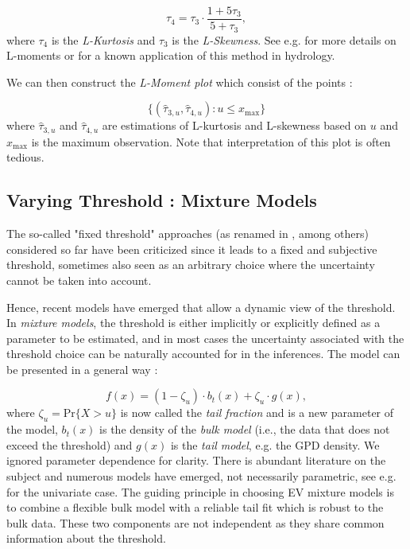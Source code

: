 \begin{equation}
\tau_4=\tau_3\cdot \frac{1+5\tau_3}{5+\tau_3},
\end{equation}
where $\tau_4$ is the \emph{L-Kurtosis} and $\tau_3$ is the \emph{L-Skewness}. See e.g. \citet{hosking_regional_1997} for more details on L-moments or \citet{peel_utility_2001} for a known application of this method in hydrology.

We can then construct the \emph{L-Moment plot} which consist of the points :

\begin{equation}
\Big\{(\hat{\tau}_{3,u},\hat{\tau}_{4,u}) : u\leq x_{\text{max}}\Big\}
\end{equation}
where $\hat{\tau}_{3,u}$ and $\hat{\tau}_{4,u}$ are estimations of L-kurtosis and L-skewness based on $u$ and $x_{\text{max}}$ is the maximum observation. Note that interpretation of this plot is often tedious.






\subsection{Varying Threshold : Mixture Models}

The so-called "fixed threshold" approaches (as renamed in 
\citet{scarrott_review_2012}, among others) considered so far have been criticized since it leads to a fixed and subjective threshold, sometimes also seen as an arbitrary choice where the uncertainty cannot be taken into account. 



Hence, recent models have emerged that allow a dynamic view of the threshold. In \textit{mixture models}, the threshold is either implicitly or explicitly defined as a parameter to be estimated, and in most cases the uncertainty associated with the threshold choice can be naturally accounted for in the inferences. The model can be presented in a general way : 

\begin{equation}
f(x)=(1-\zeta_u)\cdot b_t(x)+\zeta_u\cdot g(x),
\end{equation}
where $\zeta_u=\text{Pr}\big\{X>u\big\}$ is now called the \emph{tail fraction} and is a new parameter of the model, $b_t(x)$ is the density of the \textit{bulk model} (i.e., the data that does not exceed the threshold) and $g(x)$ is the \emph{tail model}, e.g. the GPD density. We ignored parameter dependence for clarity. There is abundant literature on the subject and numerous models have emerged, not necessarily parametric, see e.g. \citet[chap.3]{dey_extreme_2016} for the univariate case.
The guiding principle in choosing EV mixture models is to combine a flexible bulk model with a reliable tail fit which is robust to the bulk data. These two components are not independent as they share common information about the threshold.

